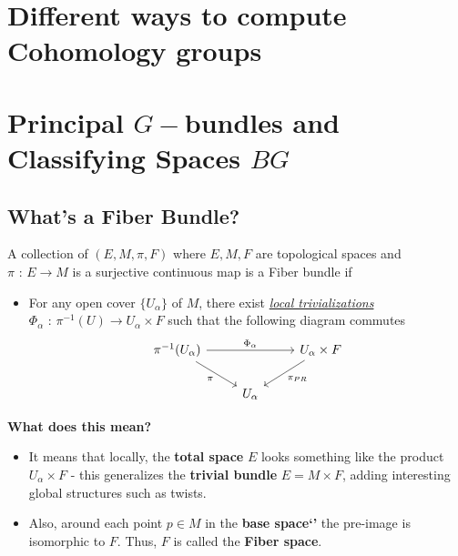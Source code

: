 \documentclass[11pt]{article}
\begin{document}
\section{Different ways to compute Cohomology groups}













\newpage
\section{Principal $G-$bundles and Classifying Spaces $BG$}

\vskip 0.5cm
\subsection{What's a Fiber Bundle?}

\begin{redbox}
  A collection of $(E, M, \pi, F)$ where $E, M, F$ are topological spaces and $\pi \text{ : } E \rightarrow M $ is a surjective continuous map is a Fiber bundle if 
  \begin{itemize}
    \item For any open cover $\{U_{\alpha}\}$ of $M$, there exist \emph{\underline{local trivializations}} $\Phi_{\alpha} \text{ : } \pi^{-1}(U) \rightarrow U_{\alpha} \times F $ such that the following diagram commutes
    \[\begin{tikzcd}
	{\pi^{-1}(U_{\alpha})} && {U_{\alpha} \times F} \\
	& {U_{\alpha}}
	\arrow["{\Phi_{\alpha}}", from=1-1, to=1-3]
	\arrow["\pi"', from=1-1, to=2-2]
	\arrow["{\pi_{PR}}", from=1-3, to=2-2]
\end{tikzcd}\]
  \end{itemize}
\end{redbox} \vskip 0.5cm \textbf{What does this mean?}
\begin{itemize}
  \item It means that locally, the \textbf{total space} $E$ looks something like the product $U_{\alpha} \times F$ - this generalizes the \textbf{trivial bundle} $E = M \times F$, adding interesting global structures such as twists. 
  \item Also, around each point $p \in M$ in the \textbf{base space`'} the pre-image is isomorphic to $F$. Thus, $F$ is called the \textbf{Fiber space}.
\end{itemize}
\end{document}
